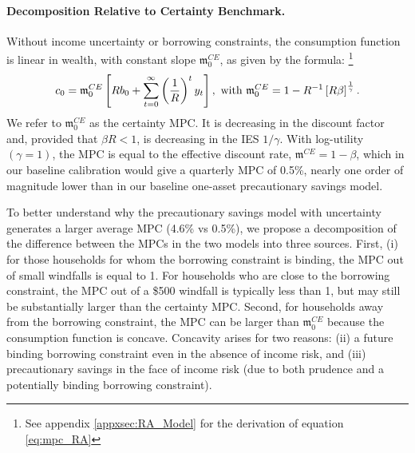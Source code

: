 \paragraph{Decomposition Relative to Certainty Benchmark.} \label{sec:MPC_decomposition_certainty} 
Without income uncertainty or borrowing constraints, the consumption function is linear in wealth, with constant slope $\mathfrak{m}_0^{CE}$, as given by the formula: \footnote{See appendix \ref{appxsec:RA_Model} for the derivation of equation \eqref{eq:mpc_RA}}
\begin{equation}
c_{0}=\mathfrak{m}_{0}^{CE}\left[ Rb_{0}+\sum_{t=0}^{\infty }\left( \frac{%
1 }{R}\right) ^{t}y_{t}\right] ,\text{ with }%
\mathfrak{m}_0^{CE}=1-R^{-1}\left[ R\beta \right] ^{%
\frac{1}{\gamma }}.  \label{eq:mpc_RA}
\end{equation}
We refer to $\mathfrak{m}_0^{CE}$ as the certainty MPC. It is decreasing in the discount factor and, provided that $\beta R<1$, is decreasing in the IES $1/\gamma$. With log-utility $\left( \gamma =1\right)$, the MPC is equal to the effective discount rate, $\mathfrak{m}^{CE}=1-\beta$, which in our baseline calibration would give a quarterly MPC of 0.5\%, nearly one order of magnitude lower than in our baseline one-asset precautionary savings model.

To better understand why the precautionary savings model with uncertainty generates a larger average MPC (4.6\% vs 0.5\%), we propose a decomposition of the difference between the MPCs in the two models into  three sources. First, (i) for those households for whom the borrowing constraint is binding, the  MPC out of small windfalls is equal to 1. For households who are close to the borrowing constraint, the MPC out of a \$500 windfall is typically less than 1, but may still be substantially larger than the certainty MPC. Second, for households away from the borrowing constraint, the MPC can be larger than $\mathfrak{m}^{CE}_0$ because the consumption function is concave. Concavity arises for two reasons: (ii) a future binding borrowing constraint even in the absence of income risk, and (iii) precautionary savings in the face of income risk (due to both prudence and a potentially binding borrowing constraint).

